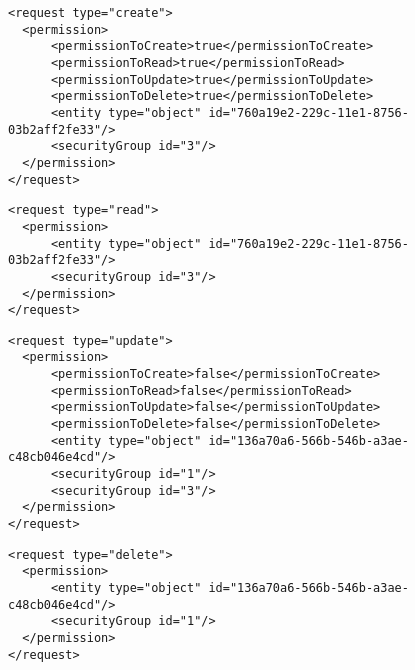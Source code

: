 \begin{lstlisting}
<request type="create">
  <permission>
      <permissionToCreate>true</permissionToCreate>  
      <permissionToRead>true</permissionToRead>
      <permissionToUpdate>true</permissionToUpdate>
      <permissionToDelete>true</permissionToDelete>
      <entity type="object" id="760a19e2-229c-11e1-8756-03b2aff2fe33"/>
      <securityGroup id="3"/>
  </permission>
</request>
\end{lstlisting}


\begin{lstlisting}
<request type="read">
  <permission>
      <entity type="object" id="760a19e2-229c-11e1-8756-03b2aff2fe33"/>
      <securityGroup id="3"/>
  </permission>
</request>
\end{lstlisting}


\begin{lstlisting}
<request type="update">
  <permission>
      <permissionToCreate>false</permissionToCreate>  
      <permissionToRead>false</permissionToRead>
      <permissionToUpdate>false</permissionToUpdate>
      <permissionToDelete>false</permissionToDelete>
      <entity type="object" id="136a70a6-566b-546b-a3ae-c48cb046e4cd"/>
      <securityGroup id="1"/>
      <securityGroup id="3"/>
  </permission>
</request>
\end{lstlisting}


\begin{lstlisting}
<request type="delete">
  <permission>
      <entity type="object" id="136a70a6-566b-546b-a3ae-c48cb046e4cd"/>
      <securityGroup id="1"/>
  </permission>
</request>
\end{lstlisting}



